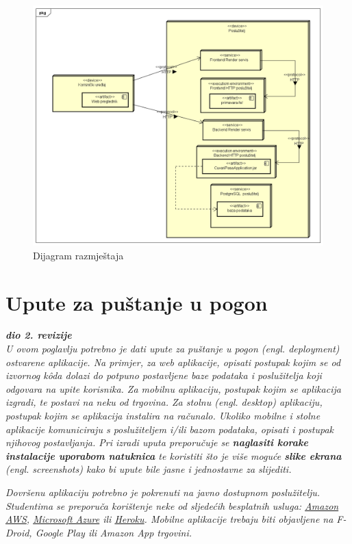 			 \begin{figure}[H]
			 	\centering
			 	\includegraphics[width=15cm]{slike/Dijagram razmjestaja}
			 	\caption{Dijagram razmještaja}
			 	\label{fig:Activity-Diagram}
			 \end{figure}
			
			\eject 
		
		\section{Upute za puštanje u pogon}
		
			\textbf{\textit{dio 2. revizije}}\\
		
			 \textit{U ovom poglavlju potrebno je dati upute za puštanje u pogon (engl. deployment) ostvarene aplikacije. Na primjer, za web aplikacije, opisati postupak kojim se od izvornog kôda dolazi do potpuno postavljene baze podataka i poslužitelja koji odgovara na upite korisnika. Za mobilnu aplikaciju, postupak kojim se aplikacija izgradi, te postavi na neku od trgovina. Za stolnu (engl. desktop) aplikaciju, postupak kojim se aplikacija instalira na računalo. Ukoliko mobilne i stolne aplikacije komuniciraju s poslužiteljem i/ili bazom podataka, opisati i postupak njihovog postavljanja. Pri izradi uputa preporučuje se \textbf{naglasiti korake instalacije uporabom natuknica} te koristiti što je više moguće \textbf{slike ekrana} (engl. screenshots) kako bi upute bile jasne i jednostavne za slijediti.}
			
			
			 \textit{Dovršenu aplikaciju potrebno je pokrenuti na javno dostupnom poslužitelju. Studentima se preporuča korištenje neke od sljedećih besplatnih usluga: \href{https://aws.amazon.com/}{Amazon AWS}, \href{https://azure.microsoft.com/en-us/}{Microsoft Azure} ili \href{https://www.heroku.com/}{Heroku}. Mobilne aplikacije trebaju biti objavljene na F-Droid, Google Play ili Amazon App trgovini.}
			
			
			\eject 